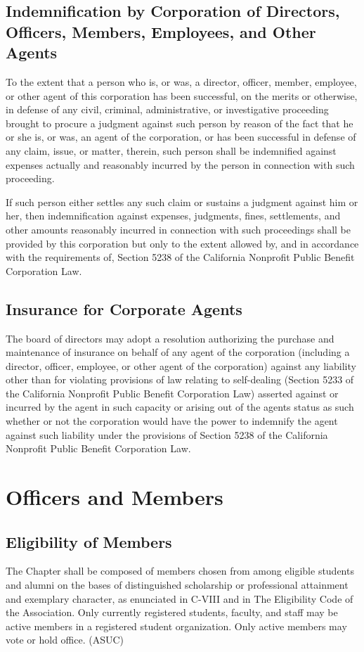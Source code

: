 \documentclass{article}
\begin{document}
	\subsection{Indemnification by Corporation of Directors, Officers, Members, Employees, and Other Agents}
	To the extent that a person who is, or was, a director, officer, member, employee, or other agent of this corporation has been successful, on the merits or otherwise, in defense of any civil, criminal, administrative, or investigative proceeding brought to procure a judgment against such person by reason of the fact that he or she is, or was, an agent of the corporation, or has been successful in defense of any claim, issue, or matter, therein, such person shall be indemnified against expenses actually and reasonably incurred by the person in connection with such proceeding. %
	
	If such person either settles any such claim or sustains a judgment against him or her, then indemnification against expenses, judgments, fines, settlements, and other amounts reasonably incurred in connection with such proceedings shall be provided by this corporation but only to the extent allowed by, and in accordance with the requirements of, Section 5238 of the California Nonprofit Public Benefit Corporation Law.
	
	\subsection{Insurance for Corporate Agents}
	The board of directors may adopt a resolution authorizing the purchase and maintenance of insurance on behalf of any agent of the corporation (including a director, officer, employee, or other agent of the corporation) against any liability other than for violating provisions of law relating to self-dealing (Section 5233 of the California Nonprofit Public Benefit Corporation Law) asserted against or incurred by the agent in such capacity or arising out of the agent\textquotesingle s status as such whether or not the corporation would have the power to indemnify the agent against such liability under the provisions of Section 5238 of the California Nonprofit Public Benefit Corporation Law.
	
	\section{Officers and Members}
	\subsection{Eligibility of Members}
	The Chapter shall be composed of members chosen from among eligible students and alumni on the bases of distinguished scholarship or professional attainment and exemplary character, as enunciated in C-VIII and in The Eligibility Code of the Association. Only currently registered students, faculty, and staff may be active members in a registered student organization. Only active members may vote or hold office. (ASUC)
\end{document}

